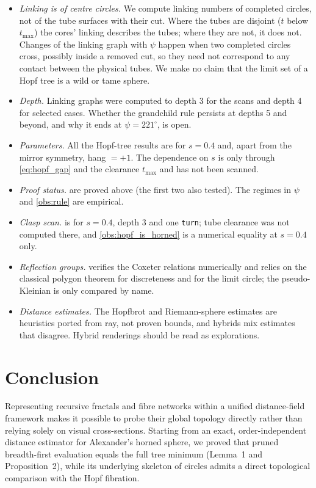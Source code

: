 \documentclass[11pt,a4paper]{article}
\theoremstyle{remark}
\newcommand{\code}[1]{\texttt{#1}}
\begin{document}
\begin{itemize}[leftmargin=*,itemsep=2pt]
\item \emph{Linking is of centre circles.}  We compute linking numbers of completed circles, not of the tube surfaces with their cut.  Where the tubes are disjoint ($t$ below $t_{\max}$) the cores' linking describes the tubes; where they are not, it does not.  Changes of the linking graph with $\psi$ happen when two completed circles cross, possibly inside a removed cut, so they need not correspond to any contact between the physical tubes.  We make no claim that the limit set of a Hopf tree is a wild or tame sphere.
\item \emph{Depth.}  Linking graphs were computed to depth 3 for the scans and depth 4 for selected cases.  Whether the grandchild rule persists at depths 5 and beyond, and why it ends at $\psi=221^\circ$, is open.
\item \emph{Parameters.}  All the Hopf-tree results are for $s=0.4$ and, apart from the mirror symmetry, hang $=+1$.  The dependence on $s$ is only through \cref{eq:hopf_gap} and the clearance $t_{\max}$ and has not been scanned.
\item \emph{Proof status.}   are proved above (the first two also tested).  The regimes in $\psi$ and \cref{obs:rule} are empirical.
\item \emph{Clasp scan.}   is for $s=0.4$, depth 3 and one \code{turn}; tube clearance was not computed there, and \cref{obs:hopf_is_horned} is a numerical equality at $s=0.4$ only.
\item \emph{Reflection groups.}   verifies the Coxeter relations numerically and relies on the classical polygon theorem for discreteness and for the limit circle; the pseudo-Kleinian is only compared by name.
\item \emph{Distance estimates.}  The Hopfbrot and Riemann-sphere estimates are heuristics ported from ray, not proven bounds, and hybrids mix estimates that disagree.  Hybrid renderings should be read as explorations.
\end{itemize}


\section{Conclusion}

Representing recursive fractals and fibre networks within a unified distance-field framework makes it possible to probe their global topology directly rather than relying solely on visual cross-sections. Starting from an exact, order-independent distance estimator for Alexander's horned sphere, we proved that pruned breadth-first evaluation equals the full tree minimum (Lemma~1 and Proposition~2), while its underlying skeleton of circles admits a direct topological comparison with the Hopf fibration.
\end{document}
